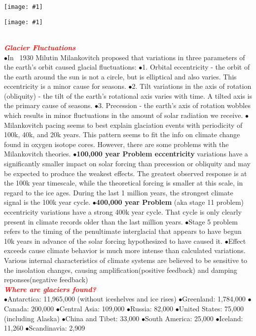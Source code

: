 \documentclass{article}
\newcommand{\ddd}{$\bullet$}
\newcommand{\red}[1]{\textcolor{red}{#1}}
\newcommand{\mysection}[1]{\\ \textbf{\textit{\red{#1}}} \\}
\newcommand{\fig}[1]{
	\texttt{[image: \#1]}
}
\begin{document}
\begin{multicols*}{4}
                \fig{Quelccaya_Glacier}
                \fig{series}
        \mysection{Glacier Fluctuations}
        \ddd In ~1930 Milutin Milankovitch proposed that variations in three parameters of the earth's orbit caused glacial fluctuations: 
        \ddd 1.	Orbital eccentricity - the orbit of the earth around the sun is not a circle, but is elliptical and also varies. This eccentricity is a minor cause for seasons.
        \ddd 2.	Tilt variations in the axis of rotation (obliquity) - the tilt of the earth's rotational axis varies with time. A tilted axis is the primary cause of seasons.
        \ddd 3.	Precession - the earth's axis of rotation wobbles which results in minor fluctuations in the amount of solar radiation we receive.
        \ddd Milankovitch pacing seems to best explain glaciation events with periodicity of 100k, 40k, and 20k years. This pattern seems to fit the info on climate change found in oxygen isotope cores. However, there are some problems with the Milankovitch theories.
        \ddd \textbf{100,000 year Problem eccentricity} variations have a significantly smaller impact on solar forcing than precession or obliquity and may be expected to produce the weakest effects. The greatest observed response is at the 100k year timescale, while the theoretical forcing is smaller at this scale, in regard to the ice ages. During the last 1 million years, the strongest climate signal is the 100k year cycle.
        \ddd \textbf{400,000 year Problem} (aka stage 11 problem) eccentricity variations have a strong 400k year cycle. That cycle is only clearly present in climate records older than the last million years.
        \ddd Stage 5 problem refers to the timing of the penultimate interglacial that appears to have begun 10k years in advance of the solar forcing hypothesized to have caused it.
        \ddd Effect exceeds cause climate behavior is much more intense than calculated variations. Various internal characteristics of climate systems are believed to be sensitive to the insolation changes, causing amplification(positive feedback) and damping reponses(negative feedback)
        \mysection{Where are glaciers found?}
            \ddd Antarctica:	11,965,000 (without iceshelves and ice rises)
            \ddd Greenland:	1,784,000
            \ddd Canada: 200,000
            \ddd Central Asia:	109,000
            \ddd Russia:	82,000
            \ddd United States:	75,000 (including Alaska)
            \ddd China and Tibet:	33,000
            \ddd South America: 25,000
            \ddd Iceland:	11,260
            \ddd Scandinavia:	2,909

\end{multicols*}
\end{document}
